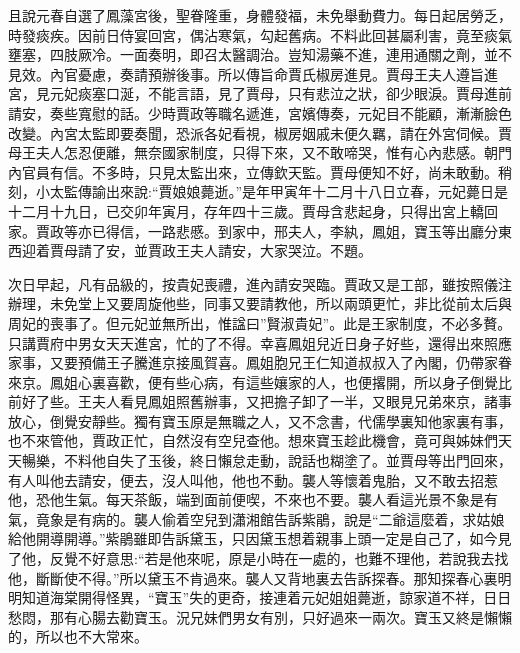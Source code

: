 \begin{parag}
    且說元春自選了鳳藻宮後，聖眷隆重，身體發福，未免舉動費力。每日起居勞乏，時發痰疾。因前日侍宴回宮，偶沾寒氣，勾起舊病。不料此回甚屬利害，竟至痰氣壅塞，四肢厥冷。一面奏明，即召太醫調治。豈知湯藥不進，連用通關之劑，並不見效。內官憂慮，奏請預辦後事。所以傳旨命賈氏椒房進見。賈母王夫人遵旨進宮，見元妃痰塞口涎，不能言語，見了賈母，只有悲泣之狀，卻少眼淚。賈母進前請安，奏些寬慰的話。少時賈政等職名遞進，宮嬪傳奏，元妃目不能顧，漸漸臉色改變。內宮太監即要奏聞，恐派各妃看視，椒房姻戚未便久羈，請在外宮伺候。賈母王夫人怎忍便離，無奈國家制度，只得下來，又不敢啼哭，惟有心內悲感。朝門內官員有信。不多時，只見太監出來，立傳欽天監。賈母便知不好，尚未敢動。稍刻，小太監傳諭出來說:“賈娘娘薨逝。”是年甲寅年十二月十八日立春，元妃薨日是十二月十九日，已交卯年寅月，存年四十三歲。賈母含悲起身，只得出宮上轎回家。賈政等亦已得信，一路悲慼。到家中，邢夫人，李紈，鳳姐，寶玉等出廳分東西迎着賈母請了安，並賈政王夫人請安，大家哭泣。不題。
\end{parag}


\begin{parag}
    次日早起，凡有品級的，按貴妃喪禮，進內請安哭臨。賈政又是工部，雖按照儀注辦理，未免堂上又要周旋他些，同事又要請教他，所以兩頭更忙，非比從前太后與周妃的喪事了。但元妃並無所出，惟諡曰”賢淑貴妃”。此是王家制度，不必多贅。只講賈府中男女天天進宮，忙的了不得。幸喜鳳姐兒近日身子好些，還得出來照應家事，又要預備王子騰進京接風賀喜。鳳姐胞兄王仁知道叔叔入了內閣，仍帶家眷來京。鳳姐心裏喜歡，便有些心病，有這些孃家的人，也便撂開，所以身子倒覺比前好了些。王夫人看見鳳姐照舊辦事，又把擔子卸了一半，又眼見兄弟來京，諸事放心，倒覺安靜些。獨有寶玉原是無職之人，又不念書，代儒學裏知他家裏有事，也不來管他，賈政正忙，自然沒有空兒查他。想來寶玉趁此機會，竟可與姊妹們天天暢樂，不料他自失了玉後，終日懶怠走動，說話也糊塗了。並賈母等出門回來，有人叫他去請安，便去，沒人叫他，他也不動。襲人等懷着鬼胎，又不敢去招惹他，恐他生氣。每天茶飯，端到面前便喫，不來也不要。襲人看這光景不象是有氣，竟象是有病的。襲人偷着空兒到瀟湘館告訴紫鵑，說是“二爺這麼着，求姑娘給他開導開導。”紫鵑雖即告訴黛玉，只因黛玉想着親事上頭一定是自己了，如今見了他，反覺不好意思:“若是他來呢，原是小時在一處的，也難不理他，若說我去找他，斷斷使不得。”所以黛玉不肯過來。襲人又背地裏去告訴探春。那知探春心裏明明知道海棠開得怪異，“寶玉”失的更奇，接連着元妃姐姐薨逝，諒家道不祥，日日愁悶，那有心腸去勸寶玉。況兄妹們男女有別，只好過來一兩次。寶玉又終是懶懶的，所以也不大常來。
\end{parag}


